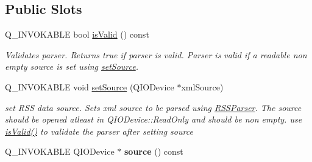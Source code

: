 \subsection*{Public Slots}
\begin{DoxyCompactItemize}
\item 
Q\-\_\-\-I\-N\-V\-O\-K\-A\-B\-L\-E bool \hyperlink{class_r_s_s_parser_a0d8ac4522e80b24d8ad4b82757ba8490}{is\-Valid} () const 
\begin{DoxyCompactList}\small\item\em Validates parser. Returns true if parser is valid. Parser is valid if a readable non empty source is set using \hyperlink{class_r_s_s_parser_a61ed20107ba616368c053eb61a99ba9d}{set\-Source}. \end{DoxyCompactList}\item 
Q\-\_\-\-I\-N\-V\-O\-K\-A\-B\-L\-E void \hyperlink{class_r_s_s_parser_a61ed20107ba616368c053eb61a99ba9d}{set\-Source} (Q\-I\-O\-Device $\ast$xml\-Source)
\begin{DoxyCompactList}\small\item\em set R\-S\-S data source. Sets xml source to be parsed using \hyperlink{class_r_s_s_parser}{R\-S\-S\-Parser}. The source should be opened atleast in Q\-I\-O\-Device\-::\-Read\-Only and should be non empty. use \hyperlink{class_r_s_s_parser_a0d8ac4522e80b24d8ad4b82757ba8490}{is\-Valid()} to validate the parser after setting source \end{DoxyCompactList}\item 
\hypertarget{class_r_s_s_parser_a2c48b78bc3dd31ba3272ff1fbb27ac35}{Q\-\_\-\-I\-N\-V\-O\-K\-A\-B\-L\-E Q\-I\-O\-Device $\ast$ {\bfseries source} () const }\label{class_r_s_s_parser_a2c48b78bc3dd31ba3272ff1fbb27ac35}


\end{DoxyCompactItemize}
